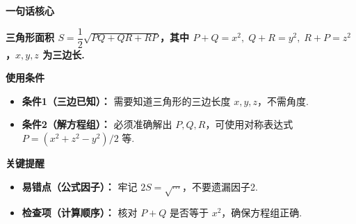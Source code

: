 \begin{summarybox}

\textbf{\textcolor{CSummary}{一句话核心}}

\textbf{三角形面积 $S = \dfrac12\sqrt{PQ+QR+RP}$，其中 $P+Q=x^2,\;Q+R=y^2,\;R+P=z^2$，$x,y,z$ 为三边长.}

\medskip
\textbf{\textcolor{CSummary}{使用条件}}
\begin{itemize}[leftmargin=*, itemsep=0.5em, topsep=0.4em]
    \item \textbf{条件1（三边已知）：} 需要知道三角形的三边长度 $x,y,z$，不需角度.
    \item \textbf{条件2（解方程组）：} 必须准确解出 $P,Q,R$，可使用对称表达式 $P = (x^2+z^2-y^2)/2$ 等.
\end{itemize}

\medskip
\textbf{\textcolor{CSummary}{关键提醒}}
\begin{itemize}[leftmargin=*, itemsep=0.5em, topsep=0.4em]
    \item \textbf{易错点（公式因子）：} 牢记 $2S = \sqrt{\cdots}$，不要遗漏因子2.
    \item \textbf{检查项（计算顺序）：} 核对 $P+Q$ 是否等于 $x^2$，确保方程组正确.
\end{itemize}

\end{summarybox}
